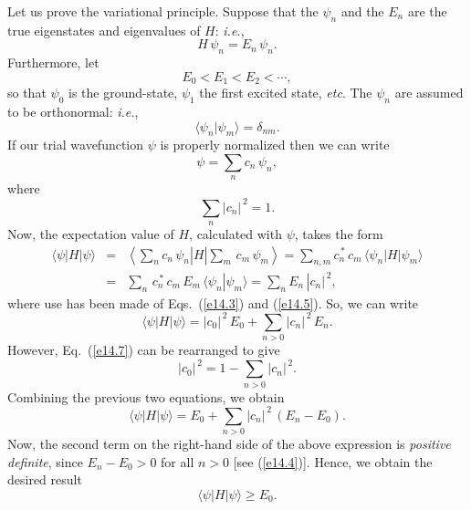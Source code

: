 Let  us prove the variational principle.
Suppose that the $\psi_n$ and the $E_n$ are the true eigenstates and eigenvalues
of $H$: {\em i.e.},
\begin{equation}\label{e14.3}
H\,\psi_n = E_n\,\psi_n.
\end{equation}
Furthermore, let
\begin{equation}\label{e14.4}
E_0 < E_1 < E_2 < \cdots,
\end{equation}
so that $\psi_0$ is the ground-state, $\psi_1$ the first excited state,
{\em etc}. The $\psi_n$ are assumed to be orthonormal:
{\em i.e.},
\begin{equation}\label{e14.5}
\langle \psi_n|\psi_m\rangle = \delta_{nm}.
\end{equation}
 If our trial wavefunction $\psi$ is properly normalized then
we can write
\begin{equation}
\psi = \sum_n c_n\,\psi_n,
\end{equation}
where
\begin{equation}\label{e14.7}
\sum_n |c_n|^{\,2} = 1.
\end{equation}
Now, the expectation value of $H$, calculated with $\psi$, takes the
form
\begin{eqnarray}
\langle\psi|H|\psi\rangle & = &\left.\left\langle \sum_n c_n\,\psi_n\right|
H\left|\sum_m\,c_m\,\psi_m\right\rangle\right. = \sum_{n,m} c_n^{\,\ast}\,c_m\,\langle \psi_n|H|\psi_m\rangle\nonumber\\[0.5ex]
&=& \sum_n\,c_n^{\,\ast}\,c_m\,E_m\,\langle \psi_n|\psi_m\rangle=
\sum_n E_n\,|c_n|^{\,2},
\end{eqnarray}
where use has been made of Eqs.~(\ref{e14.3}) and (\ref{e14.5}).
So, we can write
\begin{equation}
\langle \psi|H|\psi\rangle = |c_0|^{\,2}\,E_0 + \sum_{n>0} |c_n|^{\,2}\,E_n.
\end{equation}
However, Eq.~(\ref{e14.7}) can be rearranged to give
\begin{equation}
|c_0|^{\,2} = 1-\sum_{n>0}|c_n|^{\,2}.
\end{equation}
Combining the previous two equations, we obtain
\begin{equation}
\langle \psi|H|\psi\rangle = E_0 + \sum_{n>0} |c_n|^{\,2}\,(E_n-E_0).
\end{equation}
Now, the second term on the right-hand side of the above expression
is {\em positive definite}, since $E_n-E_0>0$  for all $n>0$ [see (\ref{e14.4})].
Hence, we obtain the desired result
\begin{equation}
\langle \psi|H|\psi\rangle \geq E_0.
\end{equation}

